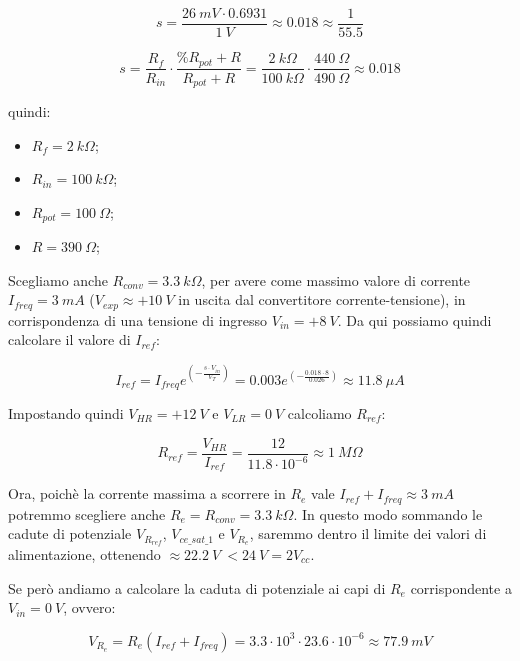 \begin{displaymath}
    s=\frac{26\ mV\cdot 0.6931}{1\ V}\approx0.018\approx\frac{1}{55.5}
\end{displaymath}

\begin{displaymath}
    s=\frac{R_f}{R_{in}}\cdot\frac{\%R_{pot}+R}{R_{pot}+R}
    =\frac{2\ k\Omega}{100\ k\Omega}\cdot\frac{440\ \Omega}{490\ \Omega}
    \approx 0.018
\end{displaymath}

quindi:

\begin{itemize}
    \item $R_f = 2\ k\Omega$;
    \item $R_{in} = 100\ k\Omega$;
    \item $R_{pot} = 100\ \Omega$;
    \item $R = 390\ \Omega$;
\end{itemize}

Scegliamo anche $R_{conv}=3.3\ k\Omega$, per avere come massimo valore di corrente
$I_{freq} = 3\ mA$ ($V_{exp}\approx+10\ V$ in uscita dal convertitore corrente-tensione),
in corrispondenza di una tensione di ingresso $V_{in}=+8\ V$. Da qui possiamo quindi calcolare
il valore di $I_{ref}$:

\begin{displaymath}
    I_{ref}=I_{freq}e^{\left(-\frac{s\cdot V_{in}}{V_T}\right)}
    =0.003e^{\left(-\frac{0.018\cdot8}{0.026}\right)}
    \approx11.8\ \mu A
\end{displaymath}

Impostando quindi $V_{HR}=+12\ V$ e $V_{LR}=0\ V$ calcoliamo $R_{ref}$:

\begin{displaymath}
    R_{ref}=\frac{V_{HR}}{I_{ref}}=\frac{12}{11.8\cdot10^{-6}}\approx 1\ M\Omega
\end{displaymath}

Ora, poichè la corrente massima a scorrere in $R_e$ vale $I_{ref}+I_{freq}\approx3\ mA$
potremmo scegliere anche $R_e=R_{conv}=3.3\ k\Omega$. In questo modo sommando le cadute di
potenziale $V_{R_{ref}}$, $V_{ce\_sat\_1}$ e $V_{R_e}$, saremmo dentro il limite dei valori
di alimentazione, ottenendo $\approx 22.2\ V\ < 24\ V= 2V_{cc}$.

Se però andiamo a calcolare la caduta di potenziale ai capi di $R_e$ corrispondente a $V_{in}=0\ V$,
ovvero:

\begin{displaymath}
    V_{R_e}=R_e(I_{ref}+I_{freq})=3.3\cdot10^3\cdot23.6\cdot10^{-6}\approx77.9\ mV
\end{displaymath}

